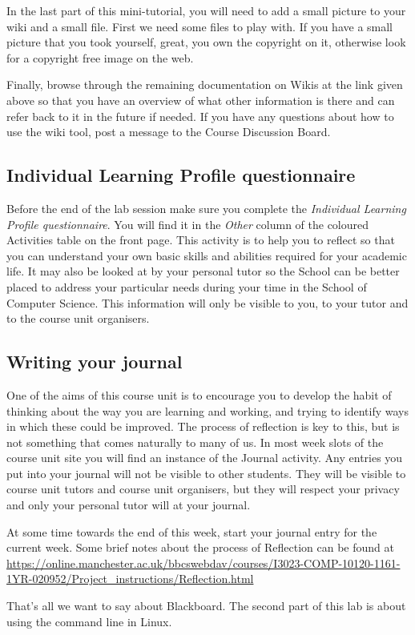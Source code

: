 \begin{firstonly}
In the last part of this mini-tutorial, you will need to add a small
picture to your wiki and a small file. First we need some files to
play with. If you have a small picture that you took yourself, great,
you own the copyright on it, otherwise look for a copyright free image
on the web.

Finally, browse through the remaining documentation on Wikis at the
link given above so that you have an overview of what other
information is there and can refer back to it in the future if
needed. If you have any questions about how to use the wiki tool, post
a message to the Course Discussion Board.

\subsection{Individual Learning Profile questionnaire}
\label{sec:indiv-learn-prof}

Before the end of the lab session make sure you complete the
\emph{Individual Learning Profile questionnaire}. You will find it in
the \emph{Other} column of the coloured Activities table on the
 front page. This activity is to help you to
reflect so that you can understand your own basic skills and abilities
required for your academic life. It may also be looked at by your
personal tutor so the School can be better placed to address your
particular needs during your time in the School of Computer
Science. This information will only be visible to you, to your tutor
and to the course unit organisers.

\subsection{Writing your journal}
\label{sec:writing-your-journal}

One of the aims of this course unit is to encourage you to develop the
habit of thinking about the way you are learning and working, and
trying to identify ways in which these could be improved. The process
of reflection is key to this, but is not something that comes
naturally to many of us. In most week slots of the course unit site
you will find an instance of the Journal activity. Any entries you put
into your journal will not be visible to other students. They will be
visible to course unit tutors and course unit organisers, but they
will respect your privacy and only your personal tutor will at your
journal.

At some time towards the end of this week, start your journal entry
for the current week. Some brief notes about the process of Reflection
can be found at
\small{\url{https://online.manchester.ac.uk/bbcswebdav/courses/I3023-COMP-10120-1161-1YR-020952/Project_instructions/Reflection.html}}

That's all we want to say about Blackboard. The second part of this
lab is about using the command line in Linux.
  
\end{firstonly}

